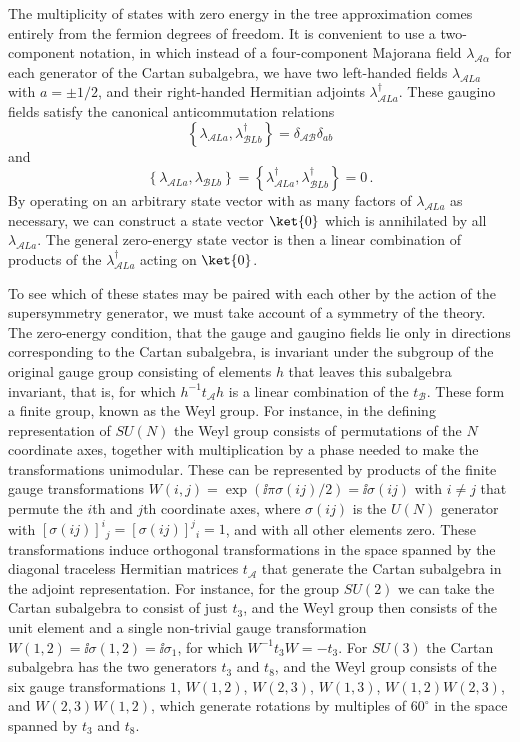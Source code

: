 The multiplicity of states with zero energy in the tree approximation comes
entirely from the fermion degrees of freedom. It is convenient to use a
two-component notation, in which instead of a four-component Majorana field
\(\lambda_{\mathcal A\alpha}\) for each generator of the Cartan subalgebra,
we have two left-handed fields \(\lambda_{\mathcal A La}\) with
\(a=\pm1/2\), and their right-handed Hermitian adjoints
\(\lambda_{\mathcal A La}^\dagger\). These gaugino fields satisfy the canonical
anticommutation relations
\[
  \left\{
    \lambda_{\mathcal A La},\lambda_{\mathcal B Lb}^\dagger
  \right\}
  =\delta_{\mathcal A\mathcal B}\delta_{ab}
\]
and
\[
  \left\{
    \lambda_{\mathcal A La},\lambda_{\mathcal B Lb}
  \right\}
  =
  \left\{
    \lambda_{\mathcal A La}^\dagger,\lambda_{\mathcal B Lb}^\dagger
  \right\}
  =0\,.
\]
By operating on an arbitrary state vector with as many factors of
\(\lambda_{\mathcal A La}\) as necessary, we can construct a state vector
\(\ket{0}\) which is annihilated by all \(\lambda_{\mathcal A La}\). The
general zero-energy state vector is then a linear combination of products
of the \(\lambda_{\mathcal A La}^\dagger\) acting on \(\ket{0}\).

To see which of these states may be paired with each other by the action of
the supersymmetry generator, we must take account of a symmetry of the
theory. The zero-energy condition, that the gauge and gaugino fields lie
only in directions corresponding to the Cartan subalgebra, is invariant
under the subgroup of the original gauge group consisting of elements
\(h\) that leaves this subalgebra invariant, that is, for which
\(h^{-1}t_{\mathcal A}h\) is a linear combination of the
\(t_{\mathcal B}\). These form a finite group, known as the Weyl group.
For instance, in the defining representation of \(SU(N)\) the Weyl group
consists of permutations of the \(N\) coordinate axes, together with
multiplication by a phase needed to make the transformations unimodular.
These can be represented by products of the finite gauge transformations
\(W(i,j)=\exp(\ii\pi\sigma(ij)/2)=\ii\sigma(ij)\) with \(i\neq j\) that
permute the \(i\)th and \(j\)th coordinate axes, where \(\sigma(ij)\) is
the \(U(N)\) generator with
\([\sigma(ij)]^i{}_j=[\sigma(ij)]^j{}_i=1\), and with all other elements
zero. These transformations induce orthogonal transformations in the space
spanned by the diagonal traceless Hermitian matrices \(t_{\mathcal A}\)
that generate the Cartan subalgebra in the adjoint representation. For
instance, for the group \(SU(2)\) we can take the Cartan subalgebra to
consist of just \(t_3\), and the Weyl group then consists of the unit
element and a single non-trivial gauge transformation
\(W(1,2)=\ii\sigma(1,2)=\ii\sigma_1\), for which
\(W^{-1}t_3W=-t_3\). For \(SU(3)\) the Cartan subalgebra has the two
generators \(t_3\) and \(t_8\), and the Weyl group consists of the six
gauge transformations \(1\), \(W(1,2)\), \(W(2,3)\), \(W(1,3)\),
\(W(1,2)W(2,3)\), and \(W(2,3)W(1,2)\), which generate rotations by
multiples of \(60^\circ\) in the space spanned by \(t_3\) and \(t_8\).

